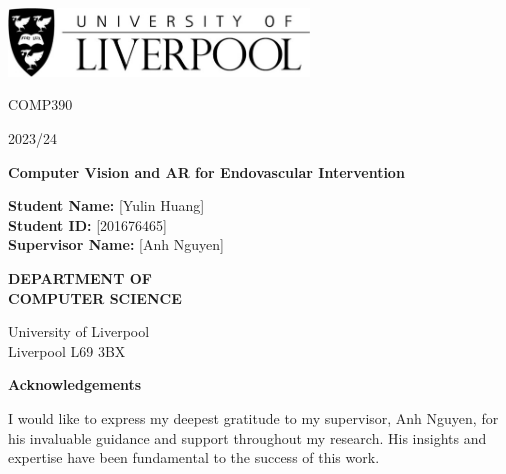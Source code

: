 \documentclass[12pt]{article}
\begin{document}
\begin{titlepage}
      \centering

      \includegraphics[width=0.6\textwidth]{Liverpool.jpg} %
      \vspace*{1cm}

      \Large
      COMP390

      \large
      2023/24

      \vspace{0.5cm}
      \Huge
      \textbf{Computer Vision and AR for Endovascular Intervention}

      \vspace{1.5cm}


      \begin{mdframed}
            \normalsize %
            \textbf{Student Name:} [Yulin Huang]\\[20pt] %
            \textbf{Student ID:} [201676465]\\[20pt] %
            \textbf{Supervisor Name:} [Anh Nguyen] %
      \end{mdframed}

      \vspace{2cm} %
      \Large
      \textbf{DEPARTMENT OF}\\
      \vspace{0.1cm} %
      \textbf{COMPUTER SCIENCE}

      \vspace{4cm} %
      \large
      University of Liverpool\\
      Liverpool L69 3BX


\end{titlepage}
\newpage
\thispagestyle{empty} %
\begin{center}
      \Large \textbf{Acknowledgements}
\end{center}
\vspace{1cm}
\normalsize
I would like to express my deepest gratitude to my supervisor, Anh Nguyen, for his invaluable guidance and support throughout my research. His insights and expertise have been fundamental to the success of this work.
\end{document}
